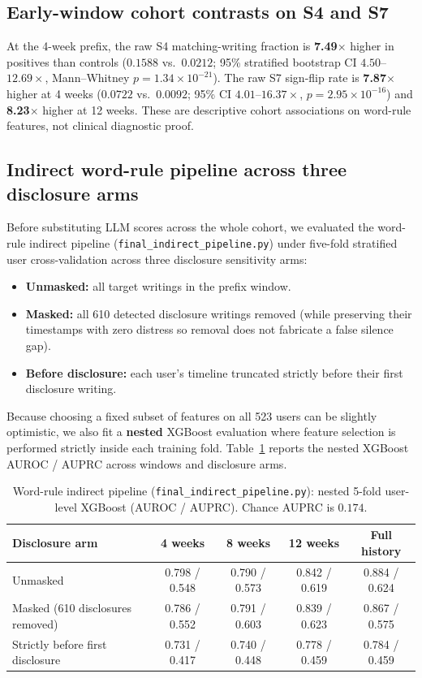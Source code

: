 \documentclass[11pt,a4paper]{article}
\begin{document}
\subsection{Early-window cohort contrasts on S4 and S7}
At the 4-week prefix, the raw S4 matching-writing fraction is \textbf{7.49$\times$} higher in positives than controls ($0.1588$ vs.\ $0.0212$; 95\% stratified bootstrap CI $4.50$--$12.69\times$, Mann--Whitney $p = 1.34\times 10^{-21}$). The raw S7 sign-flip rate is \textbf{7.87$\times$} higher at 4 weeks ($0.0722$ vs.\ $0.0092$; 95\% CI $4.01$--$16.37\times$, $p = 2.95\times 10^{-16}$) and \textbf{8.23$\times$} higher at 12 weeks. These are descriptive cohort associations on word-rule features, not clinical diagnostic proof.

\subsection{Indirect word-rule pipeline across three disclosure arms}
Before substituting LLM scores across the whole cohort, we evaluated the word-rule indirect pipeline (\texttt{final\_indirect\_pipeline.py}) under five-fold stratified user cross-validation across three disclosure sensitivity arms:
\begin{itemize}[nosep]
\item \textbf{Unmasked:} all target writings in the prefix window.
\item \textbf{Masked:} all 610 detected disclosure writings removed (while preserving their timestamps with zero distress so removal does not fabricate a false silence gap).
\item \textbf{Before disclosure:} each user's timeline truncated strictly before their first disclosure writing.
\end{itemize}

Because choosing a fixed subset of features on all 523 users can be slightly optimistic, we also fit a \textbf{nested} XGBoost evaluation where feature selection is performed strictly inside each training fold. Table~\ref{tab:indirect_nested} reports the nested XGBoost AUROC / AUPRC across windows and disclosure arms.

\begin{table}[h]
\centering
\caption{Word-rule indirect pipeline (\texttt{final\_indirect\_pipeline.py}): nested 5-fold user-level XGBoost (AUROC / AUPRC). Chance AUPRC is $0.174$.}
\label{tab:indirect_nested}
\begin{tabular}{lcccc}
\toprule
\textbf{Disclosure arm} & \textbf{4 weeks} & \textbf{8 weeks} & \textbf{12 weeks} & \textbf{Full history} \\
\midrule
Unmasked & 0.798 / 0.548 & 0.790 / 0.573 & 0.842 / 0.619 & 0.884 / 0.624 \\
Masked (610 disclosures removed) & 0.786 / 0.552 & 0.791 / 0.603 & 0.839 / 0.623 & 0.867 / 0.575 \\
Strictly before first disclosure & 0.731 / 0.417 & 0.740 / 0.448 & 0.778 / 0.459 & 0.784 / 0.459 \\
\bottomrule
\end{tabular}
\end{table}
\end{document}
